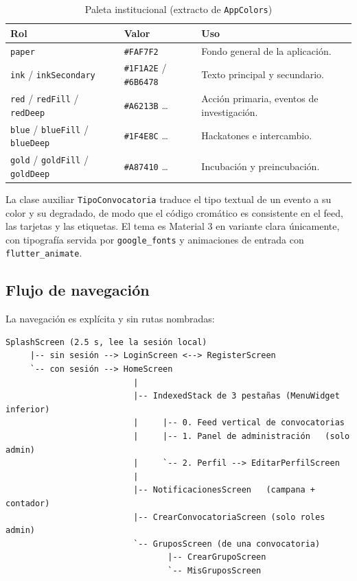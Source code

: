 \documentclass[12pt,a4paper]{article}
\begin{document}
\begin{table}[htbp]
\centering
\caption{Paleta institucional (extracto de \texttt{AppColors})}
\begin{tabular}{L{3.4cm}L{2.6cm}L{7.5cm}}
\toprule
\textbf{Rol} & \textbf{Valor} & \textbf{Uso} \\
\midrule
\texttt{paper} & \texttt{\#FAF7F2} & Fondo general de la aplicación. \\
\texttt{ink} / \texttt{inkSecondary} & \texttt{\#1F1A2E} / \texttt{\#6B6478} & Texto principal y secundario. \\
\texttt{red} / \texttt{redFill} / \texttt{redDeep} & \texttt{\#A6213B} \dots & Acción primaria, eventos de investigación. \\
\texttt{blue} / \texttt{blueFill} / \texttt{blueDeep} & \texttt{\#1F4E8C} \dots & Hackatones e intercambio. \\
\texttt{gold} / \texttt{goldFill} / \texttt{goldDeep} & \texttt{\#A87410} \dots & Incubación y preincubación. \\
\bottomrule
\end{tabular}
\end{table}

La clase auxiliar \texttt{TipoConvocatoria} traduce el tipo textual de un evento a su color y su degradado, de modo que el código cromático es consistente en el feed, las tarjetas y las etiquetas. El tema es Material 3 en variante clara únicamente, con tipografía servida por \texttt{google\_fonts} y animaciones de entrada con \texttt{flutter\_animate}.

\subsection{Flujo de navegación}
La navegación es explícita y sin rutas nombradas:

\begin{verbatim}
SplashScreen (2.5 s, lee la sesión local)
     |-- sin sesión --> LoginScreen <--> RegisterScreen
     `-- con sesión --> HomeScreen
                          |
                          |-- IndexedStack de 3 pestañas (MenuWidget inferior)
                          |     |-- 0. Feed vertical de convocatorias
                          |     |-- 1. Panel de administración   (solo admin)
                          |     `-- 2. Perfil --> EditarPerfilScreen
                          |
                          |-- NotificacionesScreen   (campana + contador)
                          |-- CrearConvocatoriaScreen (solo roles admin)
                          `-- GruposScreen (de una convocatoria)
                                 |-- CrearGrupoScreen
                                 `-- MisGruposScreen
\end{verbatim}
\end{document}
